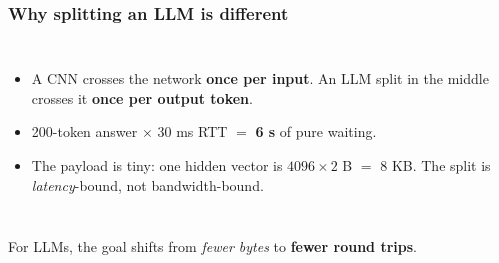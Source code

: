 \begin{frame}
\frametitle{Why splitting an LLM is different}
\vspace{10pt}
\begin{columns}[c]
\small
\begin{itemize}\setlength{\itemsep}{5pt}
  \item A CNN crosses the network \textbf{once per input}. An LLM split in the middle crosses it \textbf{once per output token}.
  \item 200-token answer $\times$ 30 ms RTT $=$ \textbf{6 s} of pure waiting.
  \item The payload is tiny: one hidden vector is $4096\times2$ B $=$ 8 KB. The split is \emph{latency}-bound, not bandwidth-bound.
\end{itemize}
\end{columns}
\vspace{14pt}
\begin{alertblock}{}
\centering For LLMs, the goal shifts from \emph{fewer bytes} to \textbf{fewer round trips}.
\end{alertblock}
\end{frame}

